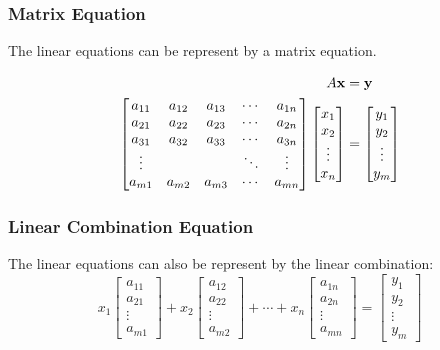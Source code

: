 \subsubsection*{Matrix Equation}
The linear equations can be represent by a matrix equation.

\begin{align*}  
A {\bf x} &= {\bf y}\\
 \begin{bmatrix} 
	a_{11} & a_{12} & a_{13}	& \cdots & a_{1n} \\
 	a_{21} & a_{22} & a_{23}	& \cdots & a_{2n} \\
  	a_{31} & a_{32} & a_{33}	& \cdots & a_{3n} \\
	\vdots 	&	&	& \ddots & \vdots \\
    	a_{m1} & a_{m2} & a_{m3}	& \cdots & a_{mn} \\
    \end{bmatrix}  \begin{bmatrix} x_1 \\ x_2 \\ \vdots \\ x_n \end{bmatrix} &= \begin{bmatrix} y_1 \\ y_2 \\ \vdots \\ y_m \end{bmatrix} 
   \end{align*}


\subsubsection*{Linear Combination Equation}
The linear equations can also be represent  by the linear combination: 
\[ x_1 \begin{bmatrix} a_{11} \\ a_{21} \\ \vdots \\ a_{m1} \end{bmatrix} + x_2  \begin{bmatrix} a_{12} \\ a_{22} \\ \vdots \\ a_{m2} \end{bmatrix} + \cdots + x_n  \begin{bmatrix} a_{1n} \\ a_{2n} \\ \vdots \\ a_{mn} \end{bmatrix} = \begin{bmatrix} y_1 \\ y_2 \\ \vdots \\ y_m \end{bmatrix}
\]

